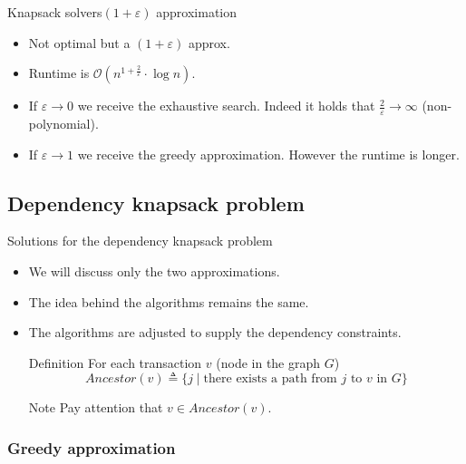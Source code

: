 \documentclass{beamer}
\begin{document}
\begin{frame}{Knapsack solvers}{$(1+\varepsilon)$ approximation} %
    \begin{itemize}
        \item {Not optimal but a $(1+\varepsilon)$ approx.}
        \item {Runtime is $\mathcal{O}(n^{1+\frac{2}{\varepsilon}}\cdot
        \log{n})$.}
        \item {If $\varepsilon \to 0$ we receive the exhaustive search. 
        Indeed it holds that $\frac{2}{\varepsilon} \to \infty$ 
        (non-polynomial).}
        \item {If $\varepsilon \to 1$ we receive the greedy approximation. 
        However the runtime is longer.}
    \end{itemize}
\end{frame}

\subsection* {Dependency knapsack problem}

\begin{frame}{Solutions for the dependency knapsack problem}
    \begin{itemize}
        \item {We will discuss only the two approximations.}
        \item {The idea behind the algorithms remains the same.}
        \item {The algorithms are adjusted to supply the dependency 
        constraints.}
        \begin{block}{Definition}
        For each transaction $v$ (node in the graph $G$)
        $$ Ancestor(v) \triangleq \{ j \mid \text{there exists a path from } 
        j \text{ to } v \text{ in } G \} $$
        \end{block}
        \begin{block}{Note}
        Pay attention that $v \in Ancestor(v)$.
        \end{block}
    \end{itemize}
    
\end{frame}
\subsubsection* {Greedy approximation}
\end{document}
